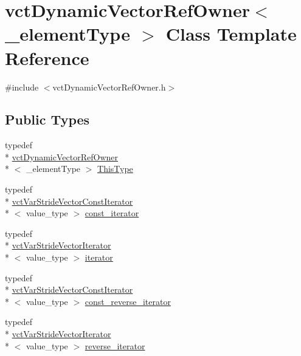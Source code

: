 \hypertarget{classvct_dynamic_vector_ref_owner}{\section{vct\-Dynamic\-Vector\-Ref\-Owner$<$ \-\_\-element\-Type $>$ Class Template Reference}
\label{classvct_dynamic_vector_ref_owner}
}


{\ttfamily \#include $<$vct\-Dynamic\-Vector\-Ref\-Owner.\-h$>$}

\subsection*{Public Types}
\begin{DoxyCompactItemize}
\item 
typedef \\*
\hyperlink{classvct_dynamic_vector_ref_owner}{vct\-Dynamic\-Vector\-Ref\-Owner}\\*
$<$ \-\_\-element\-Type $>$ \hyperlink{classvct_dynamic_vector_ref_owner_a9f1aa02eeb60e1b554086aad69baa458}{This\-Type}
\item 
typedef \\*
\hyperlink{classvct_var_stride_vector_const_iterator}{vct\-Var\-Stride\-Vector\-Const\-Iterator}\\*
$<$ value\-\_\-type $>$ \hyperlink{classvct_dynamic_vector_ref_owner_a4f7a05e13925c0eeb1d5c754c3193ba0}{const\-\_\-iterator}
\item 
typedef \\*
\hyperlink{classvct_var_stride_vector_iterator}{vct\-Var\-Stride\-Vector\-Iterator}\\*
$<$ value\-\_\-type $>$ \hyperlink{classvct_dynamic_vector_ref_owner_aaee0b96d24843f333909f2aba3aad782}{iterator}
\item 
typedef \\*
\hyperlink{classvct_var_stride_vector_const_iterator}{vct\-Var\-Stride\-Vector\-Const\-Iterator}\\*
$<$ value\-\_\-type $>$ \hyperlink{classvct_dynamic_vector_ref_owner_a9ab3900ecbd8f4d4eb4615a2c9a972a3}{const\-\_\-reverse\-\_\-iterator}
\item 
typedef \\*
\hyperlink{classvct_var_stride_vector_iterator}{vct\-Var\-Stride\-Vector\-Iterator}\\*
$<$ value\-\_\-type $>$ \hyperlink{classvct_dynamic_vector_ref_owner_a3949acd3baa131459d464b058d249990}{reverse\-\_\-iterator}
\end{DoxyCompactItemize}
